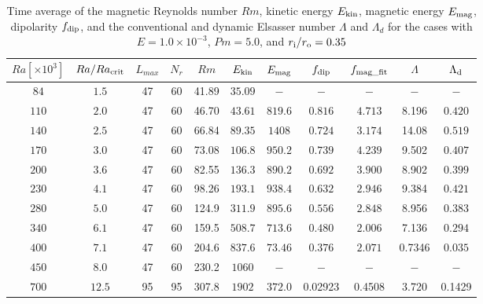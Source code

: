 \begin{table}
\caption{Time average of the magnetic Reynolds number $Rm$, kinetic energy $E_{\rm kin}$, magnetic energy $E_{\rm mag}$, dipolarity $f_{\rm dip}$, and {\color{red} the conventional and dynamic Elsasser number $\Lambda$ and $\Lambda_{d}$ for the cases with $E = 1.0 \times 10^{-3}$, $Pm = 5.0$, and} $r_{\rm i}/r_{\rm o} = 0.35$}
  \begin{tabular}{ccccccccccc}
    \hline
     $Ra[\times 10^3]$  &  $Ra/Ra_{\rm crit}$& 
     {\color{red} $L_{max}$} & {\color{red} $N_{r}$} & {\color{red} $Rm$} & $E_{\rm kin}$  &  $E_{\rm mag}$ & $f_{\rm dip}$ & $f_{\rm mag\_fit}$ & $\Lambda$ & $\Lambda_{\rm d}$\\
    \hline
      $84$  & $1.5$ & 47 & 60 & 41.89 &   $35.09$ & $-$ & $-$ & $-$ & $-$ & $-$ \\
     $110$  & $2.0$ & 47 & 60 & 46.70 &  $43.61$ & $819.6$ & $0.816$ & $4.713$ & 8.196 & $0.420$\\
     $140$  & $2.5$ & 47 & 60 & 66.84 &  $89.35$ & $1408$ & $0.724$ & $3.174$ & 14.08 & $0.519$\\
     $170$  & $3.0$ & 47 & 60 & 73.08 &  $106.8$ & $950.2$ & $0.739$ & $4.239$ & 9.502 & $0.407$\\
     $200$  & $3.6$ & 47 & 60 & 82.55 &  $136.3$ & $890.2$ & $0.692$ & $3.900$ & 8.902 & $0.399$\\
     $230$  & $4.1$ & 47 & 60 & 98.26 &  $193.1$ & $938.4$ & $0.632$ & $2.946$ & 9.384 & $0.421$\\
     $280$  & $5.0$ & 47 & 60 & 124.9 &  $311.9$ & $895.6$ & $0.556$ & $2.848$ & 8.956 & $0.383$\\
     $340$  & $6.1$ & 47 & 60 & 159.5 &  $508.7$ & $713.6$ & $0.480$ & $2.006$ & 7.136 & $0.294$\\
     $400$  & $7.1$ & 47 & 60 & 204.6 &  $837.6$ & $73.46$ & $0.376$ & $2.071$ & 0.7346 & $0.035$\\
     $450$  & $8.0$ & 47 & 60 & 230.2 &  $1060$ & $-$ & $-$ & $-$ & $-$ & $-$ \\
     $700$  & $12.5$ & 95 & 95 & 307.8 & $1902$ & $372.0$ & 0.02923 & 0.4508 & 3.720 & 0.1429 \\
    \hline
  \end{tabular}
\label{table:Summary_35}
 \end{table}
%
\begin{table}
\label{table:Summary_3115}
 \end{table}

